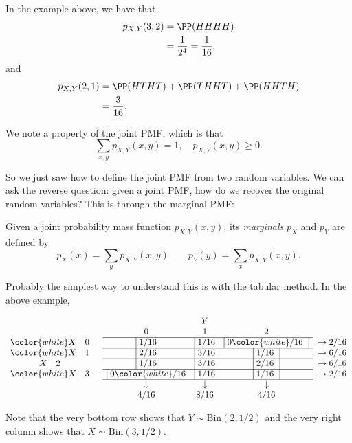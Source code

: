 \documentclass{ximera}
\begin{document}
In the example above, we have that
\begin{align*}
p_{X,Y}(3,2) &= \PP(HHHH)\\
&= \frac{1}{2^4} = \frac{1}{16}.
\end{align*}
and
\begin{align*}
p_{X,Y}(2,1) &= \PP(HTHT) + \PP(THHT) + \PP(HHTH) \\
&= \frac{3}{16}.
\end{align*}

We note a property of the joint PMF, which is that
$$
\sum_{x,y} p_{X,Y}(x,y)=1, \quad p_{X,Y}(x,y) \geq 0.
$$

So we just saw how to define the joint PMF from two random variables. We can ask the reverse question: given a joint PMF, how do we recover the original random variables? This is through the marginal PMF:

\begin{definition}
Given a joint probability mass function $p_{X,Y}(x,y)$, its \textit{marginals} $p_X$ and $p_Y$ are defined by 
$$
p_X(x) = \sum_y p_{X,Y}(x,y) \quad \quad p_Y(y) = \sum_x p_{X,Y}(x,y).
$$
\end{definition}

Probably the simplest way to understand this is with the tabular method. In the above example, 

\begin{center}
$$
\begin{array}{ ccccc } 
&& {Y} & &\\
&0 & 1 & 2 &\\
\cline{2-4} 
{\color{white} X} \quad 0 \quad & \vline \ 1/16  & \vline \  1/16  &\vline  \  0{\color{white}/16} \ \ \vline &  \rightarrow 2/16 \\ \cline{2-4}
{\color{white} X} \quad 1\quad  &\vline \ 2/16 &\vline \   3/16  &\vline \  1/16\ \ \vline & \rightarrow 6/16 \\ \cline{2-4}
X \quad 2\quad &\vline \  1/16 &\vline \  3/16 &\vline \  2/16 \ \ \vline & \rightarrow 6/16  \\ \cline{2-4}
{\color{white} X}\quad 3\quad & \vline \  0{\color{white}/16}  &\vline \  1/16    & \vline \   1/16 \ \ \vline & \rightarrow 2/16  \\ \cline{2-4} 
&  \downarrow & \downarrow & \downarrow \\
 & 4/16 & 8/16 & 4/16
\end{array}
$$
\end{center}

Note that the very bottom row shows that $Y \sim \text{Bin}(2,1/2)$ and the very right column shows that $X \sim \text{Bin}(3,1/2)$.
\end{document}
